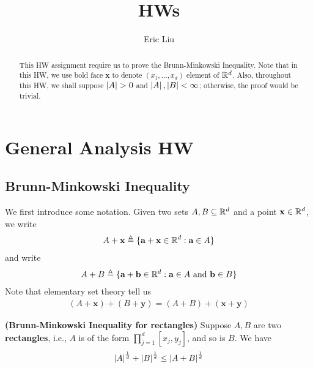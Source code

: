 \documentclass{report}
\title{\Huge{HWs}}
\author{\huge{Eric Liu}}
\date{}
\begin{document}
\maketitle
\newpage%
\tableofcontents
\pagebreak

\chapter{General Analysis HW}
\section{Brunn-Minkowski Inequality}
\begin{abstract}
  This HW assignment require us to prove the Brunn-Minkowski Inequality. Note that in this HW, we use bold face $\textbf{x}$ to denote $(x_1,\dots ,x_d)$ element of $\mathbb{R}^d$. Also, throughout this HW, we shall suppose $\abso{A}>0$ and $\left|A\right|,\left|B\right|<\infty$; otherwise, the proof would be trivial. 
\end{abstract}
\begin{mdframed}
  We first introduce some notation. Given two sets $A,B\subseteq \mathbb{R}^d$ and a point $\textbf{x}\in\mathbb{R}^d$, we write 
\begin{align*}
A+\textbf{x}\triangleq \{ \textbf{a}+\textbf{x}\in\mathbb{R}^d: \textbf{a} \in A \}
\end{align*}
and write 
\begin{align*}
A+B \triangleq \{ \textbf{a}+\textbf{b} \in\mathbb{R}^d: \textbf{a}\in A\text{ and }\textbf{b} \in  B \}
\end{align*}
Note that elementary set theory tell us 
\begin{align}
\label{trans}
  (A+\textbf{x})+(B+\textbf{y})=(A+B)+(\textbf{x}+\textbf{y})
\end{align}
\end{mdframed}
\begin{theorem}
\label{Brunn-Minkowski Inequality for Bricks}
\textbf{(Brunn-Minkowski Inequality for rectangles)} Suppose $A,B$ are two  \textbf{rectangles}, i.e., $A$ is of the form $\prod_{j=1}^d[x_j,y_j]$, and so is $B$. We have 
\begin{align*}
\left|A\right|^{\frac{1}{d}}+ \left|B\right|^{\frac{1}{d}}\leq \left|A+B\right|^{\frac{1}{d}}
\end{align*}
\end{theorem}
\end{document}

